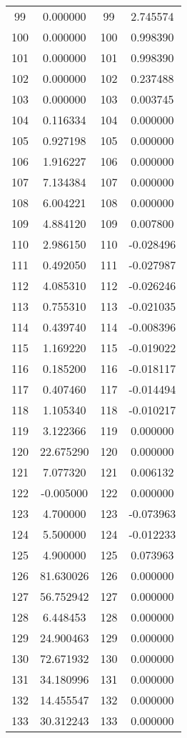 \documentclass[12pt]{article}
\begin{document}
\begin{longtable}{@{}cccc@{}}
99 & 0.000000 & 99 & 2.745574 \\
100 & 0.000000 & 100 & 0.998390 \\
101 & 0.000000 & 101 & 0.998390 \\
102 & 0.000000 & 102 & 0.237488 \\
103 & 0.000000 & 103 & 0.003745 \\
104 & 0.116334 & 104 & 0.000000 \\
105 & 0.927198 & 105 & 0.000000 \\
106 & 1.916227 & 106 & 0.000000 \\
107 & 7.134384 & 107 & 0.000000 \\
108 & 6.004221 & 108 & 0.000000 \\
109 & 4.884120 & 109 & 0.007800 \\
110 & 2.986150 & 110 & -0.028496 \\
111 & 0.492050 & 111 & -0.027987 \\
112 & 4.085310 & 112 & -0.026246 \\
113 & 0.755310 & 113 & -0.021035 \\
114 & 0.439740 & 114 & -0.008396 \\
115 & 1.169220 & 115 & -0.019022 \\
116 & 0.185200 & 116 & -0.018117 \\
117 & 0.407460 & 117 & -0.014494 \\
118 & 1.105340 & 118 & -0.010217 \\
119 & 3.122366 & 119 & 0.000000 \\
120 & 22.675290 & 120 & 0.000000 \\
121 & 7.077320 & 121 & 0.006132 \\
122 & -0.005000 & 122 & 0.000000 \\
123 & 4.700000 & 123 & -0.073963 \\
124 & 5.500000 & 124 & -0.012233 \\
125 & 4.900000 & 125 & 0.073963 \\
126 & 81.630026 & 126 & 0.000000 \\
127 & 56.752942 & 127 & 0.000000 \\
128 & 6.448453 & 128 & 0.000000 \\
129 & 24.900463 & 129 & 0.000000 \\
130 & 72.671932 & 130 & 0.000000 \\
131 & 34.180996 & 131 & 0.000000 \\
132 & 14.455547 & 132 & 0.000000 \\
133 & 30.312243 & 133 & 0.000000 \\

\end{longtable}
\end{document}
